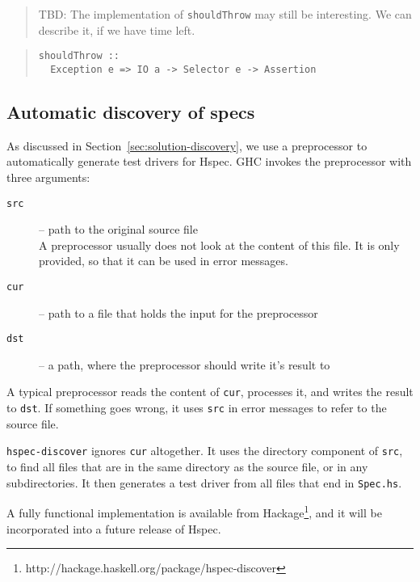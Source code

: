 \documentclass[preprint]{sigplanconf}
\begin{document}
\begin{quote}
    TBD: The implementation of \verb|shouldThrow| may still be
    interesting.  We can describe it, if we have time left.
\end{quote}

\begin{quote}
\small
\begin{verbatim}
shouldThrow ::
  Exception e => IO a -> Selector e -> Assertion
\end{verbatim}
\end{quote}

\subsection{Automatic discovery of specs}
\label{sec:implementation-discovery}

As discussed in Section~\ref{sec:solution-discovery}, we use a preprocessor to
automatically generate test drivers for Hspec.  GHC invokes the
preprocessor with three arguments:

\begin{description}
    \item[{\tt src}]
        -- path to the original source file\\
        A preprocessor usually does not
        look at the content of this file.  It is only provided, so
        that it can be used in error messages.
    \item[{\tt cur}]
        -- path to a file that holds the input for the preprocessor
    \item[{\tt dst}]
        -- a path, where the preprocessor should write it's result to
\end{description}


\noindent A typical preprocessor reads the content of {\tt cur},
processes it, and writes the result to {\tt dst}.  If something goes
wrong, it uses {\tt src} in error messages to refer to the source
file.

\verb|hspec-discover| ignores {\tt cur} altogether.  It uses the
directory component of {\tt src}, to find all files that are in the
same directory as the source file, or in any subdirectories.  It then generates
a test driver from all files that end in {\tt Spec.hs}.

A fully functional implementation is available from
Hackage\footnote{http://hackage.haskell.org/package/hspec-discover},
and it will be incorporated into a future release of Hspec.

\end{document}
